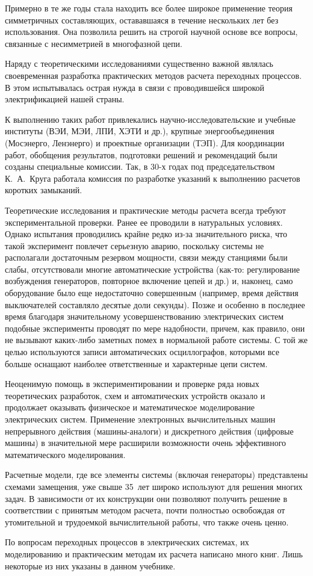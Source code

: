 Примерно в те же годы стала находить все более широкое применение теория симметричных составляющих, остававшаяся в течение нескольких лет без использования. Она позволила решить на строгой научной основе все вопросы, связанные с несимметрией в многофазной цепи.

Наряду с теоретическими исследованиями существенно важной являлась своевременная разработка практических методов расчета переходных процессов. В этом испытывалась острая нужда в связи с проводившейся широкой электрификацией нашей страны.

К выполнению таких работ привлекались научно-исследовательские и учебные институты (ВЭИ, МЭИ, ЛПИ, ХЭТИ и др.), крупные энергообъединения (Мосэнерго, Ленэнерго) и проектные организации (ТЭП). Для координации работ, обобщения результатов, подготовки решений и рекомендаций были созданы специальные комиссии. Так, в 30-х годах под председательством К.~А.~Круга работала комиссия по разработке указаний к выполнению расчетов коротких замыканий.

Теоретические исследования и практические методы расчета всегда требуют экспериментальной проверки. Ранее ее проводили в натуральных условиях. Однако испытания проводились крайне редко из-за значительного риска, что такой эксперимент повлечет серьезную аварию, поскольку системы не располагали достаточным резервом мощности, связи между станциями были слабы, отсутствовали многие автоматические устройства (как-то: регулирование возбуждения генераторов, повторное включение цепей и др.) и, наконец, само оборудование было еще недостаточно совершенным (например, время действия выключателей составляло десятые доли секунды). Позже и особенно в последнее время благодаря значительному усовершенствованию электрических систем подобные эксперименты проводят по мере надобности, причем, как правило, они не вызывают каких-либо заметных помех в нормальной работе системы. С той же целью используются записи автоматических осциллографов, которыми все больше оснащают наиболее ответственные и характерные цепи систем.

Неоценимую помощь в экспериментировании и проверке ряда новых теоретических разработок, схем и автоматических устройств оказало и продолжает оказывать физическое и математическое моделирование электрических систем. Применение электронных вычислительных машин непрерывного действия (машины-аналоги) и дискретного действия (цифровые машины) в значительной мере расширили возможности очень эффективного математического моделирования.

Расчетные модели, где все элементы системы (включая генераторы) представлены схемами замещения, уже свыше 35~лет широко используют для решения многих задач. В зависимости от их конструкции они позволяют получить решение в соответствии с принятым методом расчета, почти полностью освобождая от утомительной и трудоемкой вычислительной работы, что также очень ценно.

По вопросам переходных процессов в электрических системах, их моделированию и практическим методам их расчета написано много книг. Лишь некоторые из них указаны в данном учебнике.